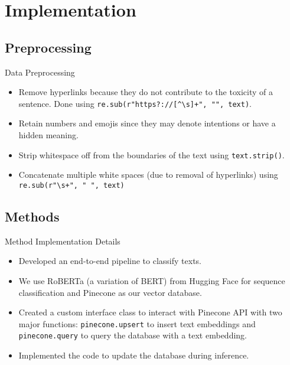 \section{Implementation}


\subsection{Preprocessing}

\begin{frame}{Data Preprocessing}

  \begin{itemize}
    \item Remove hyperlinks because they do not contribute to the toxicity of a sentence. Done using \texttt{re.sub(r"https?://[\textasciicircum \textbackslash s]+", "", text)}.
    \item Retain numbers and emojis since they may denote intentions or have a hidden meaning.
    \item Strip whitespace off from the boundaries of the text using \texttt{text.strip()}.
    \item Concatenate multiple white spaces (due to removal of hyperlinks) using \texttt{re.sub(r"\textbackslash s+", " ", text)}
  \end{itemize}
  
\end{frame}


\subsection{Methods}

\begin{frame}{Method Implementation Details}

  \begin{itemize}
    \item Developed an end-to-end pipeline to classify texts.
    \item We use RoBERTa (a variation of BERT) \citep{liu2019roberta} from Hugging Face for sequence classification and Pinecone as our vector database.
    \item Created a custom interface class to interact with Pinecone API with two major functions: \texttt{pinecone.upsert} to insert text embeddings and \texttt{pinecone.query} to query the database with a text embedding.
    \item Implemented the code to update the database during inference.
  \end{itemize}
    
\end{frame}

